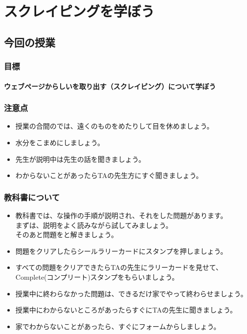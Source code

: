 \chapter{スクレイピングを学ぼう}
\section{今回の授業}

\subsection*{目標}
\subsubsection*{ウェブページからしいを取り出す（スクレイピング）について学ぼう}

\subsection*{注意点}
\begin{itemize}
	\item 授業の合間のでは、遠くのものをめたりして目を休めましょう。
	\item 水分をこまめにしましょう。
	\item 先生が説明中は先生の話を聞きましょう。
	\item わからないことがあったらTAの先生方にすぐ聞きましょう。
\end{itemize}

\subsection*{教科書について}
\begin{itemize}

	\item 教科書では、な操作の手順が説明され、それをした問題があります。\\
		  まずは、説明をよく読みながら試してみましょう。\\
		  そのあと問題をと解きましょう。
	\item 問題をクリアしたらシールラリーカードにスタンプを押しましょう。

	\item すべての問題をクリアできたらTAの先生にラリーカードを見せて、\\
	      Complete(コンプリート)スタンプをもらいましょう。
	\item 授業中に終わらなかった問題は、できるだけ家でやって終わらせましょう。
	\item 授業中にわからないところがあったらすぐにTAの先生に聞きましょう。

	\item 家でわからないことがあったら、すぐにフォームからしましょう。
\end{itemize}


